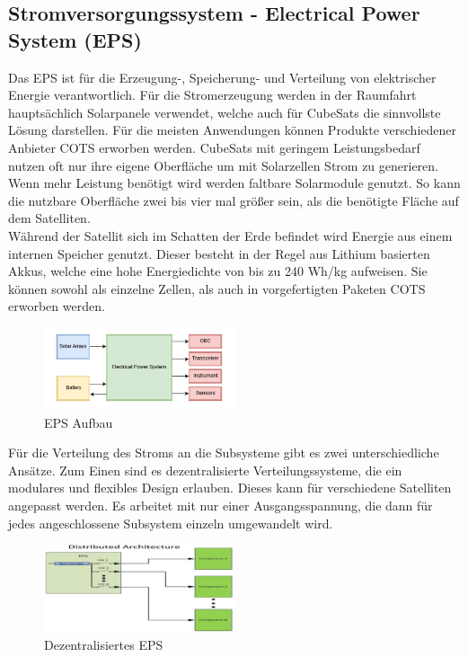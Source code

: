 		\subsection{Stromversorgungssystem - Electrical Power System (EPS)}%
Das EPS ist für die Erzeugung-, Speicherung- und Verteilung von elektrischer Energie verantwortlich. 
Für die Stromerzeugung werden in der Raumfahrt hauptsächlich Solarpanele verwendet, welche auch für CubeSats die sinnvollste Lösung darstellen.
Für die meisten Anwendungen können Produkte verschiedener Anbieter COTS erworben werden. CubeSats mit geringem Leistungsbedarf nutzen oft nur ihre eigene Oberfläche um mit Solarzellen Strom zu generieren. Wenn mehr Leistung benötigt wird werden faltbare Solarmodule genutzt. So kann die nutzbare Oberfläche zwei bis vier mal größer sein, als die benötigte Fläche auf dem Satelliten.\cite{Lettau.}\\
Während der Satellit sich im Schatten der Erde befindet wird Energie aus einem internen Speicher genutzt. Dieser besteht in der Regel aus Lithium basierten Akkus, welche eine hohe Energiedichte von bis zu 240 Wh/kg aufweisen. Sie können sowohl als einzelne Zellen, als auch in vorgefertigten Paketen COTS erworben werden.\cite{Lettau., Abaker.2017}\\
\begin{figure}[!h]
	\centering
		\includegraphics[width=0.50\textwidth]{./graphics/Struktur_EPS.PNG}
	\caption{EPS Aufbau \cite{Pelgrift.2017}}
\end{figure}

	Für die Verteilung des Stroms an die Subsysteme gibt es zwei unterschiedliche Ansätze. Zum Einen sind es dezentralisierte Verteilungssysteme, die ein modulares und flexibles Design erlauben. Dieses kann für verschiedene Satelliten angepasst werden. Es arbeitet mit nur einer Ausgangsspannung, die dann für jedes angeschlossene Subsystem einzeln umgewandelt wird.\\
\begin{figure}[!h]
	\centering
		\includegraphics[width=0.50\textwidth]{./graphics/Distributed_EPS.PNG}
	\caption{Dezentralisiertes EPS \cite{Abaker.2017}}
\end{figure}

